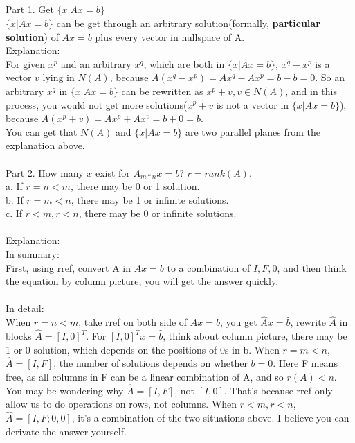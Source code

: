 \documentclass{article}
\begin{document}
\begin{spacing}{1.5}
\section{}
Part 1. Get $\{x|Ax=b\}$ \\
$\{x|Ax=b\}$ can be get through an arbitrary solution(formally, {\bfseries particular solution}) of $Ax=b$ plus every vector in nullspace of A.\\
Explanation:\\
For given $x^p$ and an arbitrary $x^q$, which are both in $\{x|Ax=b\}$, $x^q - x^p$ is a vector $v$ lying in $N(A)$, because $A(x^q - x^p) = Ax^q - Ax^p= b - b = 0$. So an arbitrary $x^q$ in $\{x|Ax=b\}$ can be rewritten as $x^p+v, v \in N(A)$, and in this process, you would not get more solutions($x^p+v$ is not a vector in $\{x|Ax=b\}$), because $A(x^p + v) = Ax^p + Ax^v= b + 0 = b$. \\
You can get that $N(A)$ and $\{x|Ax=b\}$ are two parallel planes from the explanation above. \\
\\ Part 2. How many $x$ exist for $A_{m*n}x=b$? $r=rank(A)$. \\ 
a. If $r = n < m$, there may be 0 or 1 solution. \\ 
b. If $r = m < n$, there may be 1 or infinite solutions. \\ 
c. If $r < m, r < n$, there may be 0 or infinite solutions.\\
\\ Explanation: \\
In summary: \\
First, using rref, convert A in $Ax=b$ to a combination of $I, F, 0$, and then think the equation by column picture, you will get the answer quickly. \\
\\ In detail: \\ 
When $r=n<m$, take rref on both side of $Ax=b$, you get $\hat A x = \hat b$, rewrite $\hat A$ in blocks $\hat A=[I, 0]^T$. For $[I, 0]^Tx=\hat b$, think about column picture, there may be 1 or 0 solution, which depends on the positions of 0s in b. When $r=m<n$, $\hat A = [I, F]$, the number of solutions depends on whether $b = 0$. Here F means free, as all columns in F can be a linear combination of A, and so $r(A) < n$. You may be wondering why $\hat A = [I, F]$, not $[I, 0]$. That's because rref only allow us to do operations on rows, not columns. When $r < m, r < n$, $\hat A=[I, F;0, 0]$, it's a combination of the two situations above. I believe you can derivate the answer yourself.\\



\end{spacing}
\end{document}
